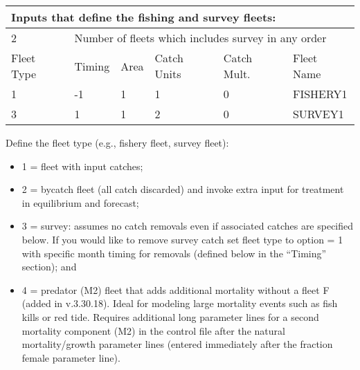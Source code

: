 \begin{center}
	\begin{tabular}{p{2cm} p{2cm} p{2cm} p{2cm} p{2cm} p{4cm}}
		\multicolumn{6}{l}{Inputs that define the fishing and survey fleets:} \\
		\hline
		2 & \multicolumn{5}{l}{Number of fleets which includes survey in any order} \Tstrut\Bstrut\\

		\hline
		Fleet Type & Timing & Area & Catch Units & Catch Mult. & Fleet Name \Tstrut\Bstrut\\

		\hline
		1 & -1 & 1 & 1 & 0 & FISHERY1 \Tstrut\\
		3 &  1 & 1 & 2 & 0 & SURVEY1 \Bstrut\\
		\hline
		
	\end{tabular}
	\leavevmode\tagmcend\tagstructend\par
\end{center}

Define the fleet type (e.g., fishery fleet, survey fleet):
	  \begin{itemize}
	  	\item 1 = fleet with input catches;
	  	\item 2 = bycatch fleet (all catch discarded) and invoke extra input for treatment in equilibrium and forecast;
	  	\item 3 = survey: assumes no catch removals even if associated catches are specified below. If you would like to remove survey catch set fleet type to option = 1 with specific month timing for removals (defined below in the ``Timing'' section); and 
	  	\item 4 = predator (M2) fleet that adds additional mortality without a fleet F (added in v.3.30.18). Ideal for modeling large mortality events such as fish kills or red tide. Requires additional long parameter lines for a second mortality component (M2) in the control file after the natural mortality/growth parameter lines (entered immediately after the fraction female parameter line).
	  \end{itemize}

